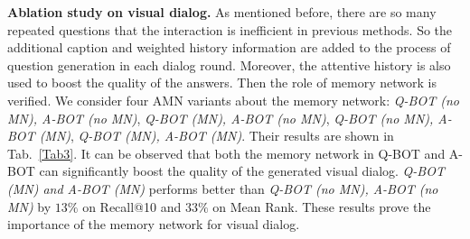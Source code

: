 \documentclass[review]{elsarticle}
\begin{document}
	\textbf{Ablation study on visual dialog.} As mentioned before, there are so many repeated questions that the interaction is inefficient in previous methods. 
	So the additional caption and weighted history information are added to the process of question generation in each dialog round. Moreover, the attentive history is also used to boost the quality of the answers.
	Then the role of memory network is verified.
	We consider four AMN variants about the memory network: \emph{Q-BOT (no MN), A-BOT (no MN)}, \emph{Q-BOT (MN), A-BOT (no MN)}, \emph{Q-BOT (no MN), A-BOT (MN)}, \emph{Q-BOT (MN), A-BOT (MN)}. 
	Their results are shown in Tab.~\ref{Tab3}. It can be observed that both the memory network in Q-BOT and A-BOT can significantly boost the quality of the generated visual dialog. 
	\emph{Q-BOT (MN) and A-BOT (MN)} performs better than \emph{Q-BOT (no MN), A-BOT (no MN)} by $13\%$ on Recall@10 and $33\%$ on Mean Rank. 
	These results prove the importance of the memory network for visual dialog. 
	
\end{document}

